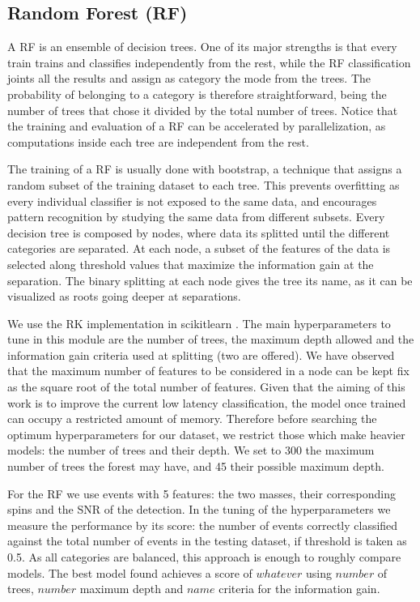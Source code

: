 \subsection{Random Forest (RF)}

A RF is an ensemble of decision trees. One of its major strengths is that every train trains and classifies independently from the rest, while the RF classification joints all the results and assign as category the mode from the trees. The probability of belonging to a category is therefore straightforward, being the number of trees that chose it divided by the total number of trees. Notice that the training and evaluation of a RF can be accelerated by parallelization, as computations inside each tree are independent from the rest.

The training of a RF is usually done with bootstrap, a technique that assigns a random subset of the training dataset to each tree. This prevents overfitting as every individual classifier is not exposed to the same data, and encourages pattern recognition by studying the same data from different subsets. Every decision tree is composed by nodes, where data its splitted until the different categories are separated. At each node, a subset of the features of the data is selected along threshold values that maximize the information gain at the separation. The binary splitting at each node gives the tree its name, as it can be visualized as roots going deeper at separations.

We use the RK implementation in scikitlearn \citep{Pedregosa:2011}. The main hyperparameters to tune in this module are the number of trees, the maximum depth allowed and the information gain criteria used at splitting (two are offered). We have observed that the maximum number of features to be considered in a node can be kept fix as the square root of the total number of features. Given that the aiming of this work is to improve the current low latency classification, the model once trained can occupy a restricted amount of memory. Therefore before searching the optimum hyperparameters for our dataset, we restrict those which make heavier models: the number of trees and their depth. We set to 300 the maximum number of trees the forest may have, and 45 their possible maximum depth.

For the RF we use events with 5 features: the two masses, their corresponding spins and the SNR of the detection. In the tuning of the hyperparameters we measure the performance  by its score: the number of events correctly classified against the total number of events in the testing dataset, if threshold is taken as 0.5. As all categories are balanced, this approach is enough to roughly compare models. The best model found achieves a score of $whatever$ using $number$ of trees, $number$ maximum depth and $name$ criteria for the information gain.



